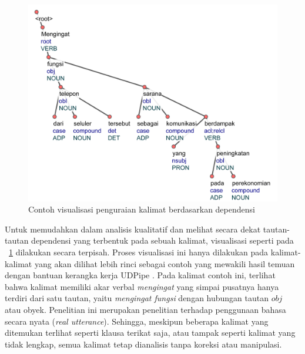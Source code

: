 \begin{figure}
	\centering \includegraphics[width=0.8
	\textwidth] {pics/visualisasi_penguraian.jpg} 
	\caption{Contoh visualisasi penguraian kalimat berdasarkan dependensi} 
\label{fig:visualisasi_penguraian} \end{figure}

Untuk memudahkan dalam analisis kualitatif dan melihat secara dekat tautan-tautan dependensi yang terbentuk pada sebuah kalimat, visualisasi seperti pada \pic~\ref{fig:visualisasi_penguraian} dilakukan secara terpisah. Proses visualisasi ini hanya dilakukan pada kalimat-kalimat yang akan dilihat lebih rinci sebagai contoh yang mewakili hasil temuan dengan bantuan kerangka kerja UDPipe \citep{udpipe2017}. Pada kalimat contoh ini, terlihat bahwa kalimat memiliki akar verbal \textit{mengingat} yang simpai pusatnya hanya terdiri dari satu tautan, yaitu \textit{mengingat fungsi} dengan hubungan tautan $obj$ atau obyek. Penelitian ini merupakan penelitian terhadap penggunaan bahasa secara nyata (\textit{real utterance}). Sehingga,  meskipun beberapa kalimat yang ditemukan terlihat seperti klausa terikat saja, atau tampak seperti kalimat yang tidak lengkap, semua kalimat tetap dianalisis tanpa koreksi atau manipulasi.

